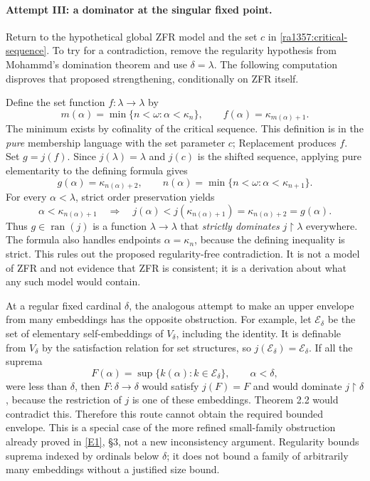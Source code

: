 \documentclass[11pt]{article}
\newcommand{\eref}[2]{\hyperlink{extra:#1:#2}{[E#2]}}
\begin{document}
\paragraph{Attempt III: a dominator at the singular fixed point.}
Return to the hypothetical global ZFR model and the set $c$ in
\eqref{ra1357:critical-sequence}.  To try for a contradiction, remove the
regularity hypothesis from Mohammd's domination theorem and use $\delta=\lambda$.
The following computation disproves that proposed strengthening, conditionally
on ZFR itself.

Define the set function $f:\lambda\to\lambda$ by
\[
 m(\alpha)=\min\{n<\omega:\alpha<\kappa_n\},\qquad
 f(\alpha)=\kappa_{m(\alpha)+1}.
\]
The minimum exists by cofinality of the critical sequence.  This definition is
in the \emph{pure} membership language with the set parameter $c$; Replacement
produces $f$.  Set $g=j(f)$.  Since $j(\lambda)=\lambda$ and $j(c)$ is the
shifted sequence, applying pure elementarity to the defining formula gives
\begin{equation}\label{ra1357:singular-dominator}
 g(\alpha)=\kappa_{n(\alpha)+2},\qquad
 n(\alpha)=\min\{n<\omega:\alpha<\kappa_{n+1}\}.
\end{equation}
For every $\alpha<\lambda$, strict order preservation yields
\[
 \alpha<\kappa_{n(\alpha)+1}
 \quad\Longrightarrow\quad
 j(\alpha)<j(\kappa_{n(\alpha)+1})
       =\kappa_{n(\alpha)+2}=g(\alpha).
\]
Thus $g\in\operatorname{ran}(j)$ is a function $\lambda\to\lambda$ that
\emph{strictly dominates} $j\!\upharpoonright\!\lambda$ everywhere.
The formula also handles endpoints $\alpha=\kappa_n$, because the defining
inequality is strict.  This rules out the proposed regularity-free
contradiction.  It is not a model of ZFR and not evidence that ZFR is
consistent; it is a derivation about what any such model would contain.

At a regular fixed cardinal $\delta$, the analogous attempt to make an upper
envelope from many embeddings has the opposite obstruction.  For example,
let $\mathcal E_\delta$ be the set of elementary self-embeddings of $V_\delta$,
including the identity.  It is definable from $V_\delta$ by the satisfaction
relation for set structures, so $j(\mathcal E_\delta)=\mathcal E_\delta$.
If all the suprema
\[
 F(\alpha)=\sup\{k(\alpha):k\in\mathcal E_\delta\},\qquad \alpha<\delta,
\]
were less than $\delta$, then $F:\delta\to\delta$ would satisfy $j(F)=F$ and
would dominate $j\!\upharpoonright\!\delta$, because the restriction of $j$
is one of these embeddings.  Theorem 2.2 would contradict this.  Therefore
this route cannot obtain the required bounded envelope.  This is a special
case of the more refined small-family obstruction already proved in
\eref{1357}{1}, \S3, not a new inconsistency argument.  Regularity bounds
suprema indexed by ordinals below $\delta$; it does not bound a family of
arbitrarily many embeddings without a justified size bound.
\end{document}
